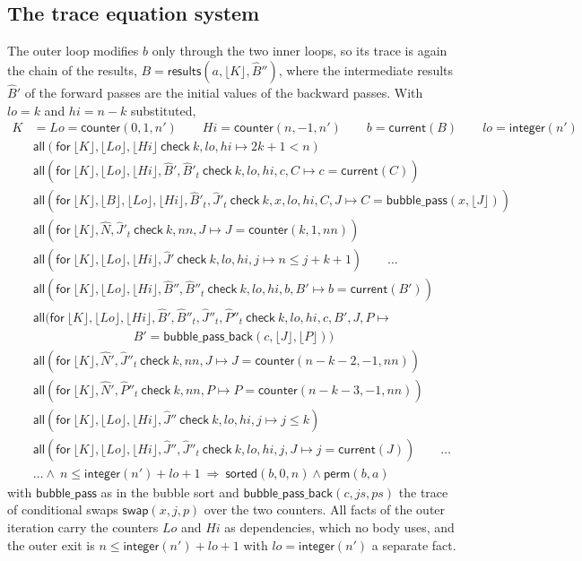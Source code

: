 \documentclass[11pt,a4paper]{article}
\newcommand{\bl}[1]{\lfloor #1\rfloor}                       %
\newcommand{\al}[2]{\mathsf{all}(\mathsf{for}\ #1\ \mathsf{check}\ #2)}
\newcommand{\cnt}{\mathsf{counter}}
\newcommand{\cur}{\mathsf{current}}
\newcommand{\intf}{\mathsf{integer}}
\newcommand{\sorted}{\mathsf{sorted}}
\newcommand{\perm}{\mathsf{perm}}
\newcommand{\swap}[3]{\mathsf{swap}(#1, #2, #3)}
\newcommand{\seq}[1]{\hat{#1}}                               %
\begin{document}
\subsection{The trace equation system}
The outer loop modifies $b$ only through the two inner loops, so its trace is again the chain of the
results, $B = \mathsf{results}(a, \bl{K}, \seq{B}'')$, where the intermediate results $\seq{B}'$ of the forward
passes are the initial values of the backward passes. With $lo = k$ and $hi = n - k$ substituted,
\begin{align}
  K &= Lo = \cnt(0, 1, n') \qquad Hi = \cnt(n, -1, n') \qquad b = \cur(B) \qquad lo = \intf(n') \label{eq:ck0}\\
  &\al{\bl{K}, \bl{Lo}, \bl{Hi}}{k, lo, hi \mapsto 2k + 1 < n} \label{eq:ck1}\\
  &\al{\bl{K}, \bl{Lo}, \bl{Hi}, \seq{B}', \seq{B}'_t}{k, lo, hi, c, C \mapsto c = \cur(C)} \nonumber\\
  &\al{\bl{K}, \bl{B}, \bl{Lo}, \bl{Hi}, \seq{B}'_t, \seq{J}'_t}{k, x, lo, hi, C, J \mapsto C = \mathsf{bubble\_pass}(x, \bl{J})} \label{eq:ck2}\\
  &\al{\bl{K}, \seq{N}, \seq{J}'_t}{k, nn, J \mapsto J = \cnt(k, 1, nn)} \nonumber\\
  &\al{\bl{K}, \bl{Lo}, \bl{Hi}, \seq{J}'}{k, lo, hi, j \mapsto n \le j + k + 1} \qquad \ldots \label{eq:ck3}\\
  &\al{\bl{K}, \bl{Lo}, \bl{Hi}, \seq{B}'', \seq{B}''_t}{k, lo, hi, b, B' \mapsto b = \cur(B')} \nonumber\\
  &\al{\bl{K}, \bl{Lo}, \bl{Hi}, \seq{B}', \seq{B}''_t, \seq{J}''_t, \seq{P}''_t}{k, lo, hi, c, B', J, P \mapsto {}\nonumber\\
  &\qquad\qquad\qquad\qquad B' = \mathsf{bubble\_pass\_back}(c, \bl{J}, \bl{P})} \label{eq:ck4}\\
  &\al{\bl{K}, \seq{N}', \seq{J}''_t}{k, nn, J \mapsto J = \cnt(n - k - 2, -1, nn)} \nonumber\\
  &\al{\bl{K}, \seq{N}', \seq{P}''_t}{k, nn, P \mapsto P = \cnt(n - k - 3, -1, nn)} \label{eq:ck5}\\
  &\al{\bl{K}, \bl{Lo}, \bl{Hi}, \seq{J}''}{k, lo, hi, j \mapsto j \le k} \nonumber\\
  &\al{\bl{K}, \bl{Lo}, \bl{Hi}, \seq{J}'', \seq{J}''_t}{k, lo, hi, j, J \mapsto j = \cur(J)} \qquad \ldots \label{eq:ck6}\\
  &\ldots \wedge\ n \le \intf(n') + lo + 1\ \Longrightarrow\ \sorted(b, 0, n) \wedge \perm(b, a) \nonumber
\end{align}
with $\mathsf{bubble\_pass}$ as in the bubble sort and $\mathsf{bubble\_pass\_back}(c, js, ps)$ the trace of
conditional swaps $\swap{x}{j}{p}$ over the two counters. All facts of the outer iteration carry the
counters $Lo$ and $Hi$ as dependencies, which no body uses, and the outer exit is $n \le \intf(n') + lo + 1$
with $lo = \intf(n')$ a separate fact.
\end{document}
